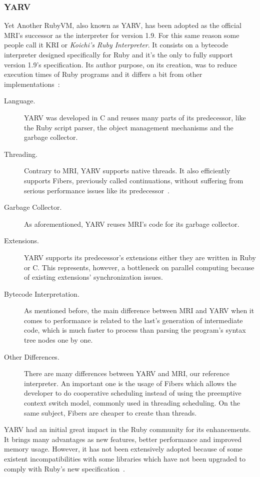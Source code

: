 \subsubsection{YARV}
Yet Another RubyVM, also known as YARV, has been adopted as the official MRI's successor as the interpreter for version 1.9. For this same reason some people call it KRI or \textit{Koichi's Ruby Interpreter}. It consists on a bytecode interpreter designed specifically for Ruby and it's the only to fully support version 1.9's specification. Its author purpose, on its creation, was to reduce execution times of Ruby programs and it differs a bit from other implementations~\cite{yarv, rubyvm_interview, ruby_intermediate_language}:
\begin{description}
\item[Language.] YARV was developed in C and reuses many parts of its predecessor, like the Ruby script parser, the object management mechanisms and the garbage collector.
\item[Threading.] Contrary to MRI, YARV supports native threads. It also efficiently supports Fibers, previously called continuations, without suffering from serious performance issues like its predecessor~\cite{memory_leak_fix_18X}.
\item[Garbage Collector.]  As aforementioned, YARV reuses MRI's code for its garbage collector.
\item[Extensions.]  YARV supports its predecessor's extensions either they are written in Ruby or C. This represents, however, a bottleneck on parallel computing because of existing extensions' synchronization issues.
\item[Bytecode Interpretation.] As mentioned before, the main difference between MRI and YARV when it comes to performance is related to the last's generation of intermediate code, which is much faster to process than parsing the program's syntax tree nodes one by one.
\item[Other Differences.] There are many differences between YARV and MRI, our reference interpreter. An important one is the usage of Fibers which allows the developer to do cooperative scheduling instead of using the preemptive context switch model, commonly used in threading scheduling. On the same subject, Fibers are cheaper to create than threads. 
\end{description}
YARV had an initial great impact in the Ruby community for its enhancements. It brings many advantages as new features, better performance and improved memory usage. However, it has not been extensively adopted because of some existent incompatibilities with some libraries which have not been upgraded to comply with Ruby's new specification~\cite{rubys_challenge_2009}.


